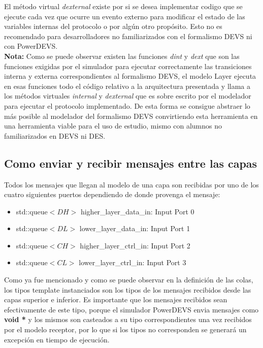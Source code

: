 \documentclass[10pt,a4paper]{article}
\begin{document}
El método virtual \textit{dexternal} existe por si se desea implementar codigo que se ejecute cada vez que ocurre un evento externo para modificar el estado de las variables internas del protocolo o por algún otro propósito. Esto no es recomendado para desarrolladores no familiarizados con el formalismo DEVS ni con PowerDEVS. \\

\textbf{Nota:} Como se puede observar existen las funciones \textit{dint} y \textit{dext} que son las funciones exigidas por el simulador para ejecutar correctamente las transiciones interna y externa correspondientes al formalismo DEVS, el modelo Layer ejecuta en esas funciones todo el código relativo a la arquitectura presentada y llama a los métodos virtuales \textit{internal} y \textit{dexternal} que es sobre escrito por el modelador para ejecutar el protocolo implementado. De esta forma se consigue abstraer lo más posible al modelador del formalismo DEVS convirtiendo esta herramienta en una herramienta viable para el uso de estudio, mismo con alumnos no familiarizados en DEVS ni DES. 

\subsection{Como enviar y recibir mensajes entre las capas}

Todos los mensajes que llegan al modelo de una capa son recibidas por uno de los cuatro siguientes puertos dependiendo de donde provenga el mensaje:
\begin{itemize}
\item std::queue$<DH>$ higher\_layer\_data\_in:  Input Port 0
\item std::queue$<DL>$ lower\_layer\_data\_in:   Input Port 1
\item std::queue$<CH>$ higher\_layer\_ctrl\_in:  Input Port 2 
\item std::queue$<CL>$ lower\_layer\_ctrl\_in:   Input Port 3
\end{itemize}

Como ya fue mencionado y como se puede observar en la definición de las colas, los tipos template instanciados son los tipos de los mensajes recibidos desde las capas superior e inferior. Es importante que los mensajes recibidos sean efectivamente de este tipo, porque el simulador PowerDEVS envia mensajes como \textbf{void *} y los mismos son casteados a su tipo correspondientes una vez recibidos por el modelo receptor, por lo que si los tipos no corresponden se generará un excepción en tiempo de ejecución. \\
\end{document}
